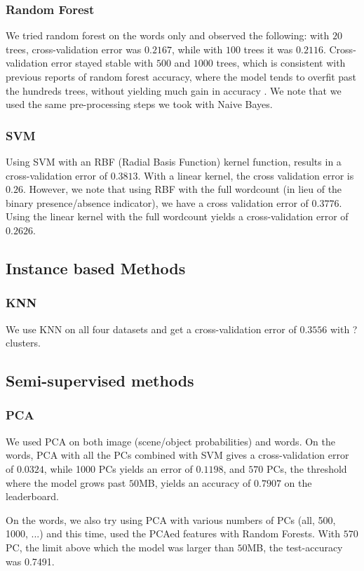 \documentclass[11pt,twocolumn]{report}
\begin{document}
     \subsubsection{Random Forest}
     We tried random forest on the words only and observed the following: with $20$ trees, cross-validation error was $0.2167$, while with $100$ trees it was $0.2116$. Cross-validation error stayed stable with $500$ and $1000$ trees, which is consistent with previous reports of random forest accuracy, where the model tends to overfit past the hundreds trees, without yielding much gain in accuracy \cite{latinne2001limiting,oshiro2012many}. We note that we used the same pre-processing steps we took with Naive Bayes.

    \subsubsection{SVM}
    Using SVM with an RBF (Radial Basis Function) kernel function, results in a cross-validation error of $0.3813$. With a linear kernel, the cross validation error is $0.26$. However, we note that using RBF with the full wordcount (in lieu of the binary presence/absence indicator), we have a cross validation error of $0.3776$. Using the linear kernel with the full wordcount yields a cross-validation error of $0.2626$.
    
    \subsection*{Instance based Methods}
    \subsubsection{KNN}
    
    We use KNN on all four datasets and get a cross-validation error of $0.3556$ with ? clusters.
   
    \subsection*{Semi-supervised methods}
    \subsubsection*{PCA}
    We used PCA on both image (scene/object probabilities) and words. On the words, PCA with all the PCs combined with SVM gives a cross-validation error of $0.0324$, while 1000 PCs yields an error of $0.1198$, and $570$ PCs, the threshold where the model grows past $50$MB, yields an accuracy of $0.7907$ on the leaderboard.
    \par
   On the words, we also try using PCA with various numbers of PCs (all, 500, 1000, ...) and this time, used the PCAed features with Random Forests. With $570$ PC, the limit above which the model was larger than $50$MB, the test-accuracy was 0.7491.\\
\end{document}
